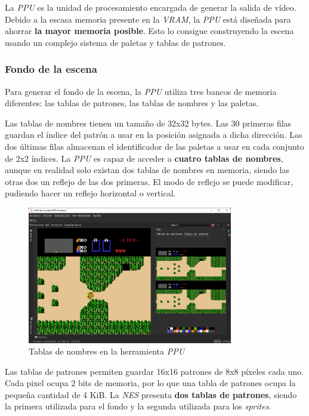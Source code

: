 La \textit{PPU} es la unidad de procesamiento encargada de generar
la salida de vídeo.
Debido a la escasa memoria presente en la \textit{VRAM}, la \textit{PPU}
está diseñada para ahorrar \textbf{la mayor memoria posible}.
Esto lo consigue construyendo la escena usando un complejo
sistema de paletas y tablas de patrones.

\subsubsection{Fondo de la escena}\label{subsubsec:fondo-de-la-escena}

Para generar el fondo de la escena, la \textit{PPU} utiliza
tres bancos de memoria diferentes: las tablas de patrones,
las tablas de nombres y las paletas.

Las tablas de nombres tienen un tamaño de 32x32 bytes.
Las 30 primeras filas guardan el índice del patrón
a usar en la posición asignada a dicha dirección.
Las dos últimas filas almacenan el identificador de las
paletas a usar en cada conjunto de 2x2 índices.
La \textit{PPU} es capaz de acceder a \textbf{cuatro tablas
de nombres}, aunque en realidad solo existan dos
tablas de nombres en memoria, siendo las otras dos
un reflejo de las dos primeras.
El modo de reflejo se puede modificar, pudiendo
hacer un reflejo horizontal o vertical.

\begin{figure}[h]
    \centering
    \includegraphics[width=0.8\textwidth]{images/nes/nes-nametables}
    \caption{Tablas de nombres en la herramienta \textit{PPU}}
    \label{fig:nes-nametables}
\end{figure}

Las tablas de patrones permiten guardar 16x16 patrones de
8x8 píxeles cada uno.
Cada pixel ocupa 2 bits de memoria, por lo que una tabla
de patrones ocupa la pequeña cantidad de 4 KiB.
La \textit{NES} presenta \textbf{dos tablas de patrones}, siendo
la primera utilizada para el fondo y la segunda utilizada
para los \textit{sprites}.

